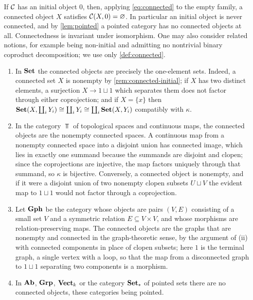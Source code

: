 \begin{remark}\label{rem:connected-initial}
If $\mathcal{C}$ has an initial object $0$, then, applying \eqref{eq:connected} to the
empty family, a connected object $X$ satisfies $\mathcal{C}(X,0)=\varnothing$. In
particular an initial object is never connected, and by \cref{lem:pointed} a
pointed category has no connected objects at all. Connectedness is invariant
under isomorphism. One may also consider related notions, for example being
non-initial and admitting no nontrivial binary coproduct decomposition; we use
only \cref{def:connected}.
\end{remark}

\begin{example}\label{ex:connected}
\begin{enumerate}
\item In $\mathbf{Set}$ the connected objects are precisely the one-element sets.
  Indeed, a connected set $X$ is nonempty by \cref{rem:connected-initial};
  if $X$ has two distinct elements, a surjection $X\to 1\sqcup 1$ which
  separates them does not factor through either coprojection; and if
  $X=\{x\}$ then $\mathbf{Set}(X,\coprod_iY_i)\cong\coprod_iY_i\cong\coprod_i\mathbf{Set}(X,Y_i)$
  compatibly with $\kappa$.
\item In the category $\Top$ of topological spaces and continuous maps, the
  connected objects are the nonempty connected spaces. A continuous map from a
  nonempty connected space into a disjoint union has connected image, which lies
  in exactly one summand because the summands are disjoint and clopen; since the
  coprojections are injective, the map factors uniquely through that summand, so
  $\kappa$ is bijective. Conversely, a connected object is
  nonempty, and if it were a disjoint union of two nonempty clopen subsets
  $U\sqcup V$ the evident map to $1\sqcup 1$ would not factor through a
  coprojection.
\item Let $\mathbf{Gph}$ be the category whose objects are pairs $(V,E)$ consisting
  of a small set $V$ and a symmetric relation $E\subseteq V\times V$, and whose
  morphisms are relation-preserving maps. The connected objects are the
  graphs that are nonempty and connected in the graph-theoretic sense, by the
  argument of (ii) with connected components in place of clopen subsets; here
  $1$ is the terminal graph, a single vertex with a loop, so that the map from a
  disconnected graph to $1\sqcup1$ separating two components is a morphism.
\item In $\mathbf{Ab}$, $\mathbf{Grp}$, $\mathbf{Vect}_k$ or the category $\mathbf{Set}_{*}$ of pointed sets
  there are no connected objects, these categories being pointed.
\end{enumerate}
\end{example}

